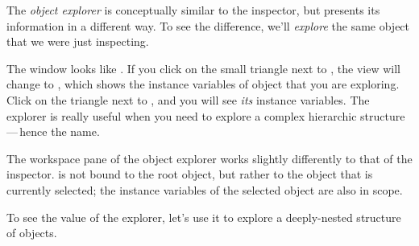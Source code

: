 \documentclass[a4paper,10pt,twoside]{book}
\begin{document}
The \emph{object explorer} is conceptually similar to the inspector, but presents its information in a different way.
To see the difference, we'll \emph{explore} the same object that we were just inspecting.

The  window looks like .
If you click on the small triangle next to , the view will change to , which shows the instance variables of object that you are exploring.
Click on the triangle next to , and you will see \emph{its} instance variables.  
The explorer is really useful when you need to explore a complex hierarchic structure\,---\,hence the name.

The workspace pane of the object explorer works slightly differently to that of the inspector.
 is not bound to the root object, but rather to the object that is currently selected; the instance variables of the selected object are also in scope.
{}

To see the value of the explorer, let's use it to explore a deeply-nested structure of objects.

\end{document}
